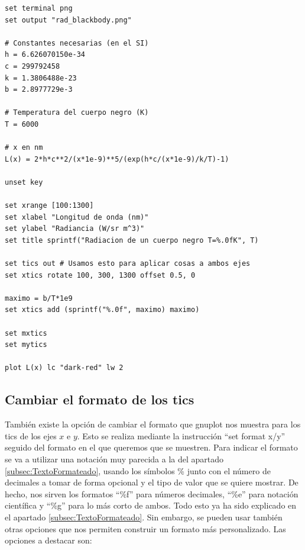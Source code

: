 \documentclass[11pt,a4paper,twoside,pdf]{article}
\numberwithin{equation}{section}
\begin{document}
\begin{lstlisting}[language=Gnuplot]
set terminal png
set output "rad_blackbody.png"

# Constantes necesarias (en el SI)
h = 6.626070150e-34
c = 299792458
k = 1.3806488e-23
b = 2.8977729e-3

# Temperatura del cuerpo negro (K)
T = 6000

# x en nm  
L(x) = 2*h*c**2/(x*1e-9)**5/(exp(h*c/(x*1e-9)/k/T)-1)

unset key

set xrange [100:1300]
set xlabel "Longitud de onda (nm)"
set ylabel "Radiancia (W/sr m^3)"
set title sprintf("Radiacion de un cuerpo negro T=%.0fK", T)

set tics out # Usamos esto para aplicar cosas a ambos ejes
set xtics rotate 100, 300, 1300 offset 0.5, 0

maximo = b/T*1e9
set xtics add (sprintf("%.0f", maximo) maximo)

set mxtics
set mytics

plot L(x) lc "dark-red" lw 2
\end{lstlisting}

\subsection{Cambiar el formato de los tics}

También existe la opción de cambiar el formato que gnuplot nos muestra para los tics de los ejes $x$ e $y$. Esto se realiza mediante la instrucción ``set format x/y'' seguido del formato en el que queremos que se muestren. Para indicar el formato se va a utilizar una notación muy parecida a la del apartado \ref{subsec:TextoFormateado}, usando los símbolos \% junto con el número de decimales a tomar de forma opcional y el tipo de valor que se quiere mostrar. De hecho, nos sirven los formatos ``\%f'' para números decimales, ``\%e'' para notación científica y ``\%g'' para lo más corto de ambos. Todo esto ya ha sido explicado en el apartado \ref{subsec:TextoFormateado}. Sin embargo, se pueden usar también otras opciones que nos permiten construir un formato más personalizado. Las opciones a destacar son:
\end{document}

